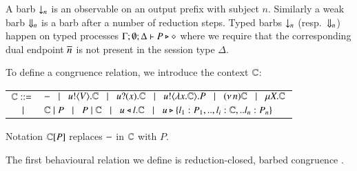\smallskip 

A barb $\downarrow_{n}$ is an observable on an output prefix with subject $n$.
Similarly a weak barb $\Downarrow_{n}$ is a barb after a number of reduction steps.
Typed barbs $\downarrow_{n}$ (resp.\ $\Downarrow_{n}$)
happen on typed processes $\Gamma; \emptyset; \Delta \vdash P \triangleright \diamond$
where we require that the corresponding dual endpoint $\overline{n}$ is not present
in the session type $\Delta$.

To define a congruence relation, we introduce the context ${\Bbb C}$:\\  

\hspace{-1cm}\begin{tabular}{rl}
	${\Bbb C}::=$\!\!\!\! & $- \;\;\;|\;\;\; u ! \langle V \rangle . {\Bbb C} \;\;\;|\;\;\; u ? (x) . {\Bbb C}
\;\;\;|\;\;\; u ! \langle \lambda x.{\Bbb C} \rangle . P
\;\;\;|\;\;\; (\nu\, n) {\Bbb C} \;\;\;|\;\;\; \mu X. {\Bbb C}$\\ 
             $\;\;\;|\;\;\;$\!\!\!\!& ${\Bbb C} \;|\; P \;\;\;|\;\;\; P \;|\; {\Bbb C} 
\;\;\;|\;\;\; u \triangleleft l . {\Bbb C} \;\;\;|\;\;\; u \triangleright \{l_1:P_1,..,l_i:{\Bbb C},..l_n:P_n\}$\\
	\end{tabular}

\noi Notation ${\Bbb C}[P]$ replaces $-$ in ${\Bbb C}$ with $P$.

\smallskip 

\noi The first behavioural relation we define is reduction-closed, barbed congruence \cite{HondaKYoshida95}. 

\smallskip 

